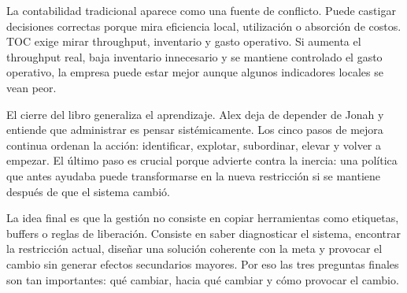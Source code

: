 \documentclass[
  11pt,
]{article}
\begin{document}
La contabilidad tradicional aparece como una fuente de conflicto. Puede
castigar decisiones correctas porque mira eficiencia local, utilización
o absorción de costos. TOC exige mirar throughput, inventario y gasto
operativo. Si aumenta el throughput real, baja inventario innecesario y
se mantiene controlado el gasto operativo, la empresa puede estar mejor
aunque algunos indicadores locales se vean peor.

El cierre del libro generaliza el aprendizaje. Alex deja de depender de
Jonah y entiende que administrar es pensar sistémicamente. Los cinco
pasos de mejora continua ordenan la acción: identificar, explotar,
subordinar, elevar y volver a empezar. El último paso es crucial porque
advierte contra la inercia: una política que antes ayudaba puede
transformarse en la nueva restricción si se mantiene después de que el
sistema cambió.

La idea final es que la gestión no consiste en copiar herramientas como
etiquetas, buffers o reglas de liberación. Consiste en saber
diagnosticar el sistema, encontrar la restricción actual, diseñar una
solución coherente con la meta y provocar el cambio sin generar efectos
secundarios mayores. Por eso las tres preguntas finales son tan
importantes: qué cambiar, hacia qué cambiar y cómo provocar el cambio.
\end{document}
